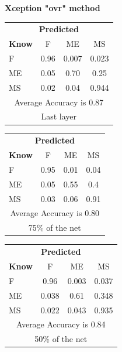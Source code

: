 \documentclass[12pt]{article} %
\begin{document}
\begin{center}
\textbf{Xception "ovr" method}
\end{center}
\begin{minipage}{0.5\textwidth}
\begin{center}
\begin{tabular}{l|c|c|c|}
 \multicolumn{4}{c}{ \textbf{ Predicted}}\\
 \textbf{Know}&F&ME&MS\\ \hline\hline
F   &0.96&0.007&0.023\\
ME &0.05&0.70&0.25\\
MS &0.02&0.04&0.944\\
\multicolumn{4}{c}{Average Accuracy is 0.87}\\
\multicolumn{4}{c}{Last layer}\\
\end{tabular}
\end{center}
\end{minipage}
\begin{minipage}{0.5\textwidth}
\begin{center}
\begin{tabular}{l|c|c|c|}
 \multicolumn{4}{c}{ \textbf{ Predicted}}\\
 \textbf{Know}&F&ME&MS\\ \hline\hline
F    &0.95&0.01&0.04\\
ME &0.05&0.55&0.4\\
MS &0.03&0.06&0.91\\
\multicolumn{4}{c}{Average Accuracy is 0.80}\\
\multicolumn{4}{c}{75\%  of the net}\\
\end{tabular}
\end{center}
\end{minipage}
\begin{minipage}{0.5\textwidth}
\begin{center}
\begin{tabular}{l|c|c|c|}
 \multicolumn{4}{c}{ \textbf{ Predicted}}\\
 \textbf{Know}&F&ME&MS\\ \hline\hline
F   &0.96&0.003&0.037\\
ME &0.038&0.61&0.348\\
MS &0.022&0.043&0.935\\
\multicolumn{4}{c}{Average Accuracy is 0.84}\\
\multicolumn{4}{c}{50\%  of the net}\\
\end{tabular}
\end{center}
\end{minipage}
\end{document}
